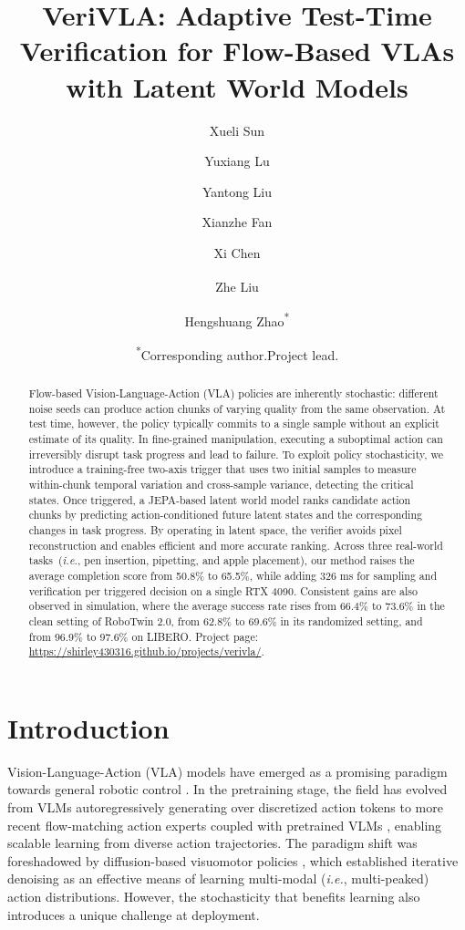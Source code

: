 \documentclass[10pt,twocolumn,letterpaper]{article}
\title{VeriVLA: Adaptive Test-Time Verification for Flow-Based VLAs\\with Latent World Models}
\author{Xueli Sun}
\author{Yuxiang Lu}
\author{Yantong Liu}
\author{Xianzhe Fan\authorcr}
\author{Xi Chen}
\author{Zhe Liu\textsuperscript{\textdagger}}
\author{Hengshuang Zhao\textsuperscript{*}}
\affil{The University of Hong Kong}
\affil{The University of Hong Kong\\
  {\small \textsuperscript{*}Corresponding author.\quad \textsuperscript{\textdagger}Project lead.}}
\date{\textsuperscript{*}Corresponding author.\quad \textsuperscript{\textdagger}Project lead.}
\date{}
\begin{document}
\maketitle

\begin{abstract}

Flow-based Vision-Language-Action (VLA) policies are inherently stochastic: different noise seeds can produce action chunks of varying quality from the same observation. At test time, however, the policy typically commits to a single sample without an explicit estimate of its quality. In fine-grained manipulation, executing a suboptimal action can irreversibly disrupt task progress and lead to failure. To exploit policy stochasticity, we introduce a training-free two-axis trigger that uses two initial samples to measure within-chunk temporal variation and cross-sample variance, detecting the critical states. Once triggered, a JEPA-based latent world model ranks candidate action chunks by predicting action-conditioned future latent states and the corresponding changes in task progress. By operating in latent space, the verifier avoids pixel reconstruction and enables efficient and more accurate ranking. Across three real-world tasks~(\textit{i.e.}, pen insertion, pipetting, and apple placement), our method raises the average completion score from 50.8\% to 65.5\%, while adding 326 ms for sampling and verification per triggered decision on a single RTX 4090. Consistent gains are also observed in simulation, where the average success rate rises from 66.4\% to 73.6\% in the clean setting of RoboTwin 2.0, from 62.8\% to 69.6\% in its randomized setting, and from 96.9\% to 97.6\% on LIBERO. Project page: \url{https://shirley430316.github.io/projects/verivla/}.

\end{abstract}

\section{Introduction}
\label{sec:intro}

Vision-Language-Action (VLA) models have emerged as a promising paradigm towards general robotic control \cite{brohan2023rt1roboticstransformerrealworld,kim2024openvlaopensourcevisionlanguageactionmodel, black2024pi0visionlanguageactionflowmodel}. In the pretraining stage, the field has evolved from VLMs autoregressively generating over discretized action tokens \cite{brohan2023rt2visionlanguageactionmodelstransfer,
kim2024openvlaopensourcevisionlanguageactionmodel, pertsch2025fastefficientactiontokenization} to more recent flow-matching action experts coupled with pretrained VLMs \cite{
nvidia2025gr00tn1openfoundation,
black2024pi0visionlanguageactionflowmodel, intelligence2025pi05visionlanguageactionmodelopenworld}, enabling scalable learning from diverse action trajectories. The paradigm shift was foreshadowed by diffusion-based visuomotor policies \cite{chi2024diffusionpolicyvisuomotorpolicy}, which established iterative denoising as an effective means of learning multi-modal (\textit{i.e.}, multi-peaked) action distributions. However, the stochasticity that benefits learning also introduces a unique challenge at deployment.
\end{document}
